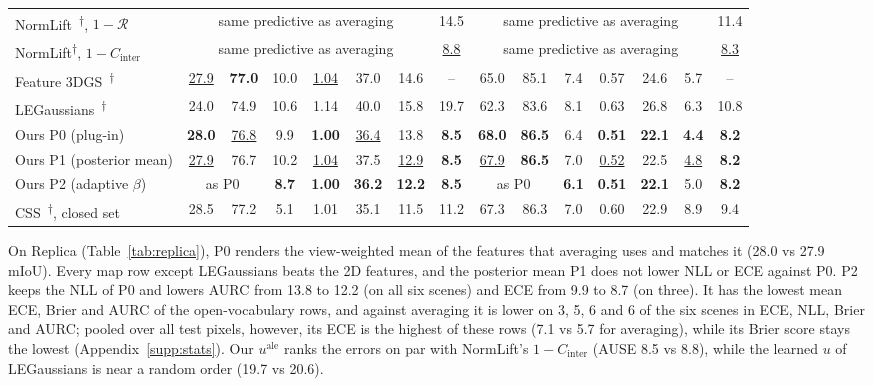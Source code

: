 \documentclass[journal]{IEEEtran}
\newcommand{\reimpl}{\textsuperscript{$\dagger$}}   %
\begin{document}
\begin{table}[t]
\begin{tabular}{@{}l*{7}{c}@{\hspace{10pt}}*{7}{c}@{}}
NormLift~\cite{zang2026normlift}\reimpl, $1-\mathcal{R}$ & \multicolumn{6}{c}{same predictive as averaging} & 14.5 & \multicolumn{6}{c}{same predictive as averaging} & 11.4\\
NormLift\reimpl, $1-C_{\mathrm{inter}}$ & \multicolumn{6}{c}{same predictive as averaging} & \underline{8.8} & \multicolumn{6}{c}{same predictive as averaging} & \underline{8.3}\\
Feature 3DGS~\cite{zhou2024feature}\reimpl & \underline{27.9} & \textbf{77.0} & 10.0 & \underline{1.04} & 37.0 & 14.6 & -- & 65.0 & 85.1 & 7.4 & 0.57 & 24.6 & 5.7 & --\\
LEGaussians~\cite{shi2024legaussians}\reimpl & 24.0 & 74.9 & 10.6 & 1.14 & 40.0 & 15.8 & 19.7 & 62.3 & 83.6 & 8.1 & 0.63 & 26.8 & 6.3 & 10.8\\
\midrule
Ours P0 (plug-in) & \textbf{28.0} & \underline{76.8} & 9.9 & \textbf{1.00} & \underline{36.4} & 13.8 & \textbf{8.5} & \textbf{68.0} & \textbf{86.5} & 6.4 & \textbf{0.51} & \textbf{22.1} & \textbf{4.4} & \textbf{8.2}\\
Ours P1 (posterior mean) & \underline{27.9} & 76.7 & 10.2 & \underline{1.04} & 37.5 & \underline{12.9} & \textbf{8.5} & \underline{67.9} & \textbf{86.5} & 7.0 & \underline{0.52} & 22.5 & \underline{4.8} & \textbf{8.2}\\
Ours P2 (adaptive $\beta$) & \multicolumn{2}{c}{as P0} & \textbf{8.7} & \textbf{1.00} & \textbf{36.2} & \textbf{12.2} & \textbf{8.5} & \multicolumn{2}{c}{as P0} & \textbf{6.1} & \textbf{0.51} & \textbf{22.1} & 5.0 & \textbf{8.2}\\
\midrule
CSS~\cite{wilson2025css}\reimpl, closed set & 28.5 & 77.2 & 5.1 & 1.01 & 35.1 & 11.5 & 11.2 & 67.3 & 86.3 & 7.0 & 0.60 & 22.9 & 8.9 & 9.4\\
\bottomrule
\end{tabular}
\end{table}


On Replica (Table~\ref{tab:replica}), P0 renders the view-weighted mean of the features that averaging uses and matches it (28.0 vs 27.9 mIoU). Every map row except LEGaussians beats the 2D features, and the posterior mean P1 does not lower NLL or ECE against P0. P2 keeps the NLL of P0 and lowers AURC from 13.8 to 12.2 (on all six scenes) and ECE from 9.9 to 8.7 (on three). It has the lowest mean ECE, Brier and AURC of the open-vocabulary rows, and against averaging it is lower on 3, 5, 6 and 6 of the six scenes in ECE, NLL, Brier and AURC; pooled over all test pixels, however, its ECE is the highest of these rows (7.1 vs 5.7 for averaging), while its Brier score stays the lowest (Appendix~\ref{supp:stats}). Our $u^{\mathrm{ale}}$ ranks the errors on par with NormLift's $1-C_{\mathrm{inter}}$ (AUSE 8.5 vs 8.8), while the learned $u$ of LEGaussians is near a random order (19.7 vs 20.6).
\end{document}
